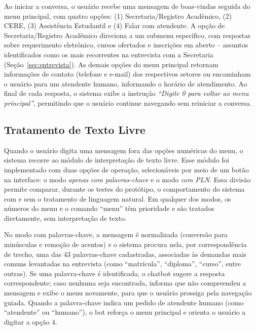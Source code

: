 \documentclass[12pt]{article}
\begin{document}
Ao iniciar a conversa, o usuário recebe uma mensagem de boas-vindas
seguida do menu principal, com quatro opções: (1) Secretaria/Registro
Acadêmico, (2) CERE, (3) Assistência Estudantil e (4) Falar com
atendente. A opção de Secretaria/Registro Acadêmico direciona a um
submenu específico, com respostas sobre requerimento eletrônico, cursos
ofertados e inscrições em aberto -- assuntos identificados como os mais
recorrentes na entrevista com a Secretaria (Seção~\ref{sec:entrevista}). As demais opções do
menu principal retornam informações de contato (telefone e e-mail) dos
respectivos setores ou encaminham o usuário para um atendente humano,
informando o horário de atendimento. Ao final de cada resposta, o
sistema exibe a instrução \textit{``Digite 0 para voltar ao menu
principal''}, permitindo que o usuário continue navegando sem reiniciar a
conversa.

\subsection{Tratamento de Texto Livre}\label{sec:textolivre}

Quando o usuário digita uma mensagem fora das opções numéricas do menu, o
sistema recorre ao módulo de interpretação de texto livre. Esse módulo foi
implementado com duas opções de operação, selecionáveis por meio de um
botão na interface: o modo \textit{apenas com palavras-chave} e o modo
\textit{com PLN}. Essa divisão permite comparar, durante os testes do
protótipo, o comportamento do sistema com e sem o tratamento de linguagem
natural. Em qualquer dos modos, os números do menu e o comando ``menu'' têm
prioridade e são tratados diretamente, sem interpretação de texto.

No modo com palavras-chave, a mensagem é normalizada (conversão para
minúsculas e remoção de acentos) e o sistema procura nela, por
correspondência de trecho, uma das 43 palavras-chave cadastradas,
associadas às demandas mais comuns levantadas na entrevista (como
``matrícula'', ``diploma'', ``curso'', entre outras). Se uma palavra-chave é
identificada, o chatbot sugere a resposta correspondente; caso nenhuma
seja encontrada, informa que não compreendeu a mensagem e exibe o menu
novamente, para que o usuário prossiga pela navegação guiada. Quando a
palavra-chave indica um pedido de atendente humano (como ``atendente'' ou
``humano''), o bot reforça o menu principal e orienta o usuário a digitar a
opção 4.
\end{document}
